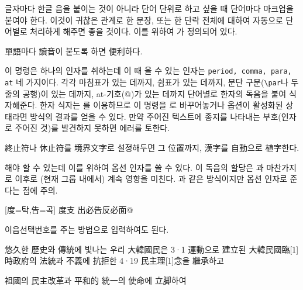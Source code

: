 \documentclass[a4paper,12pt,itemph,footnote]{oblivoir}
\begin{document}
글자마다 한글 음을 붙이는 것이 아니라 단어 단위로 하고 싶을 때
단어마다 마크업을 붙여야 한다. 이것이 귀찮은 관계로 한 문장, 또는 한 단락
전체에 대하여 자동으로 단어별로 처리하게 해주면 좋을 것이다.
이를 위하여 가 정의되어 있다.

\begin{myexam}[]
 單語마다 讀音이 붙도록 하면 便利하다.
\end{myexam}

이 명령은 하나의 인자를 취하는데 이 때 올 수 있는 인자는 \texttt{period, comma, para, at} 네
가지이다. 각각 마침표가 있는 데까지, 쉼표가 있는 데까지, 문단 구분(\verb|\par|나 두 줄의 공행)이 있는 데까지,
at-기호(@)가 있는 데까지
단어별로 한자의 독음을 붙여 식자해준다.
한자 식자는 를 이용하므로 이 명령을 로
바꾸어놓거나  옵션이 활성화된 상태라면  방식의 결과를 얻을 수 있다.
만약 주어진 텍스트에 종지를 나타내는 부호(인자로 주어진 것)를
발견하지 못하면 에러를 토한다.

\begin{myexam}[]
\let\rwhanja=\grrwhanja
{} 終止符나 休止符를 境界文字로 설정해두면 그 位置까지,
漢字를 自動으로 植字한다.
\end{myexam}

해야 할 수 있는데 이를 위하여
옵션 인자를 쓸 수 있다. 이 독음의 할당은 과 마찬가지로 이후로 (현재 그룹 내에서) 계속
영향을 미친다. 과 같은 방식이지만 옵션 인자로 준다는 점에 주의.

\begin{myexam}[]
[度=탁,告=곡] 度支 出必告反必面@
\end{myexam}

이음선택번호를 주는 방법으로 입력하여도 된다.

\begin{myexam}[]
\let\rwhanja=\grrwhanja {} 
悠久한 歷史와 傳統에 빛나는 우리 大韓國民은 3·1 運動으로 建立된
大韓民國臨[1]時政府의 法統과 不義에 抗拒한 4·19 民主理[1]念을 繼承하고

祖國의 民主改革과 平和的 統一의 使命에 立脚하여
\end{myexam}
\end{document}
